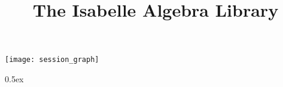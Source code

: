 \documentclass[11pt,a4paper]{article}
\begin{document}
\title{The Isabelle Algebra Library}
\maketitle

\tableofcontents

\begin{center}
  \texttt{[image: session\_graph]}
\end{center}

\clearpage

\parindent 0pt\parskip 0.5ex


\end{document}
